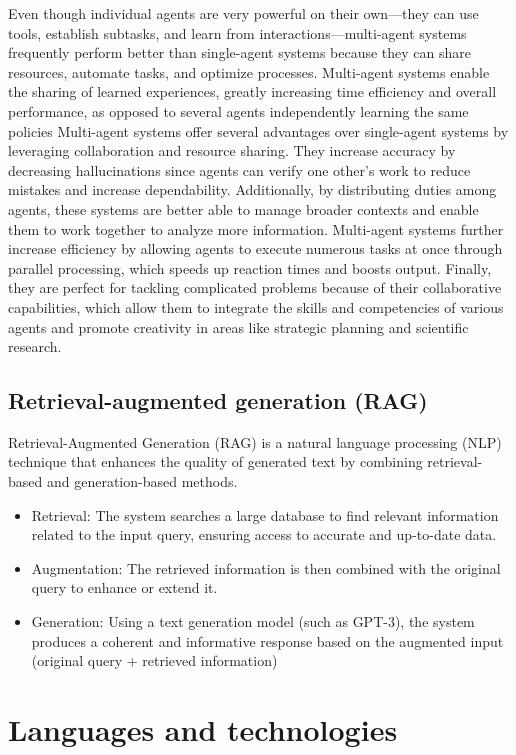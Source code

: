        Even though individual agents are very powerful on their own—they can use tools, establish subtasks, and learn from interactions—multi-agent systems frequently perform better than single-agent systems because they can share resources, automate tasks, and optimize processes. Multi-agent systems enable the sharing of learned experiences, greatly increasing time efficiency and overall performance, as opposed to several agents independently learning the same policies Multi-agent systems offer several advantages over single-agent systems by leveraging collaboration and resource sharing. They increase accuracy by decreasing hallucinations since agents can verify one other's work to reduce mistakes and increase dependability. Additionally, by distributing duties among agents, these systems are better able to manage broader contexts and enable them to work together to analyze more information. Multi-agent systems further increase efficiency by allowing agents to execute numerous tasks at once through parallel processing, which speeds up reaction times and boosts output. Finally, they are perfect for tackling complicated problems because of their collaborative capabilities, which allow them to integrate the skills and competencies of various agents and promote creativity in areas like strategic planning and scientific research.
        \cite{SuperAnnotate2}
    
    \subsection{Retrieval-augmented generation (RAG)}
    Retrieval-Augmented Generation (RAG) is a natural language processing (NLP) technique that enhances the quality of generated text by combining retrieval-based and generation-based methods.
    \cite{Martineau}
        \begin{itemize}
        \item  Retrieval: The system searches a large database to find relevant information related to the input query, ensuring access to accurate and up-to-date data.
        \item  Augmentation: The retrieved information is then combined with the original query to enhance or extend it.
        \item  Generation: Using a text generation model (such as GPT-3), the system produces a coherent and informative response based on the augmented input (original query + retrieved information)
        \end{itemize}
\section{Languages and technologies}
